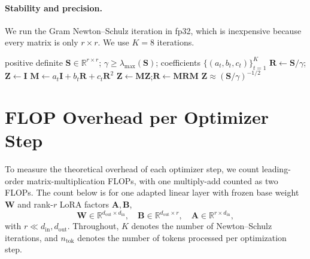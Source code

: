 \documentclass[11pt]{article}
\newcommand{\mat}[1]{\bm{#1}}
\begin{document}
\paragraph{Stability and precision.}
We run the Gram Newton--Schulz iteration in fp32, which is inexpensive because
every matrix is only $r\times r$.  We use $K=8$ iterations.


\begin{algorithm}[ht]
\caption{Gram Newton--Schulz iteration}
\label{alg:gramns}
\begin{algorithmic}[1]
\Require positive definite $\mat{S} \in \mathbb{R}^{r \times r}$; $\gamma \ge \lambda_{\max}(\mat{S})$; coefficients $\{(a_t,b_t,c_t)\}_{t=1}^{K}$
\Statex\vspace{-0.5\baselineskip}
\State $\mat{R}\gets \mat{S}/\gamma$;\quad $\mat{Z}\gets \mat{I}$ \Comment{normalize so $\lambda_{\max}(\mat{R})\le 1$}
  \State $\mat{M}\gets a_t \mat{I}+b_t \mat{R}+c_t \mat{R}^2$
  \State $\mat{Z}\gets \mat{M}\mat{Z}$;\quad $\mat{R}\gets \mat{M}\mat{R}\mat{M}$
\EndFor
\State \Return $\mat{Z}\approx (\mat{S}/\gamma)^{-1/2}$
\end{algorithmic}
\end{algorithm}







\section{FLOP Overhead per Optimizer Step}
\label{app:flops}
To measure the theoretical overhead of each optimizer step, we count
leading-order matrix-multiplication FLOPs, with one multiply-add counted as two
FLOPs.  The count below is for one
adapted linear layer with frozen base weight $\mat{W}$ and rank-$r$ LoRA factors
$\mat{A},\mat{B}$,
\[
  \mat{W}\in\mathbb{R}^{d_{\mathrm{out}}\times d_{\mathrm{in}}},\quad
  \mat{B}\in\mathbb{R}^{d_{\mathrm{out}}\times r},\quad
  \mat{A}\in\mathbb{R}^{r\times d_{\mathrm{in}}},
\]
with $r\ll d_{\mathrm{in}},d_{\mathrm{out}}$.  Throughout, $K$ denotes the number
of Newton--Schulz iterations, and $n_{\mathrm{tok}}$ denotes the number of tokens
processed per optimization step.
\end{document}
